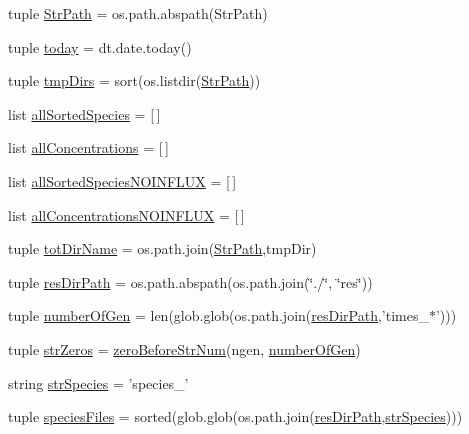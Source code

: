 \begin{DoxyCompactItemize}
\item 
tuple \hyperlink{a00096_a60fb7d39ab8835d4b764461220e796e2}{Str\-Path} = os.\-path.\-abspath(Str\-Path)
\item 
tuple \hyperlink{a00096_a71bc5e3d205016fb7893b438e75be78e}{today} = dt.\-date.\-today()
\item 
tuple \hyperlink{a00096_ac88c3245a42ebefee3fcf90626f6eaf4}{tmp\-Dirs} = sort(os.\-listdir(\hyperlink{a00096_a60fb7d39ab8835d4b764461220e796e2}{Str\-Path}))
\item 
list \hyperlink{a00096_aafc595063b7c4b74f94c0931ff2370a5}{all\-Sorted\-Species} = \mbox{[}$\,$\mbox{]}
\item 
list \hyperlink{a00096_ae708f0b0e671f432735f039e1ff6b6ca}{all\-Concentrations} = \mbox{[}$\,$\mbox{]}
\item 
list \hyperlink{a00096_a02a8db664a67956bc698b79f7c31a7bd}{all\-Sorted\-Species\-N\-O\-I\-N\-F\-L\-U\-X} = \mbox{[}$\,$\mbox{]}
\item 
list \hyperlink{a00096_acda16f4751633455ab19e92bdc5baf2a}{all\-Concentrations\-N\-O\-I\-N\-F\-L\-U\-X} = \mbox{[}$\,$\mbox{]}
\item 
tuple \hyperlink{a00096_ad3caf9c42727aaab24f4ea4dae362fc9}{tot\-Dir\-Name} = os.\-path.\-join(\hyperlink{a00096_a60fb7d39ab8835d4b764461220e796e2}{Str\-Path},tmp\-Dir)
\item 
tuple \hyperlink{a00096_a35eb3b681c7408f1476b92798d4f2c16}{res\-Dir\-Path} = os.\-path.\-abspath(os.\-path.\-join(\char`\"{}./\char`\"{}, \char`\"{}res\char`\"{}))
\item 
tuple \hyperlink{a00096_ac014a9b46a060e4fed96eaee9614345b}{number\-Of\-Gen} = len(glob.\-glob(os.\-path.\-join(\hyperlink{a00096_a35eb3b681c7408f1476b92798d4f2c16}{res\-Dir\-Path},'times\-\_\-$\ast$')))
\item 
tuple \hyperlink{a00096_a5708d1d44920d75a918ec1c988c02c57}{str\-Zeros} = \hyperlink{a00096_a97aba03091fd66dde4375e3dbffdbede}{zero\-Before\-Str\-Num}(ngen, \hyperlink{a00096_ac014a9b46a060e4fed96eaee9614345b}{number\-Of\-Gen})
\item 
string \hyperlink{a00096_aa76707ba3058ba96fc8e5aeafa461193}{str\-Species} = 'species\-\_\-'
\item 
tuple \hyperlink{a00096_a670249d163388a9d93c8f3b9fb63afac}{species\-Files} = sorted(glob.\-glob(os.\-path.\-join(\hyperlink{a00096_a35eb3b681c7408f1476b92798d4f2c16}{res\-Dir\-Path},\hyperlink{a00096_aa76707ba3058ba96fc8e5aeafa461193}{str\-Species})))
\item 

\end{DoxyCompactItemize}
